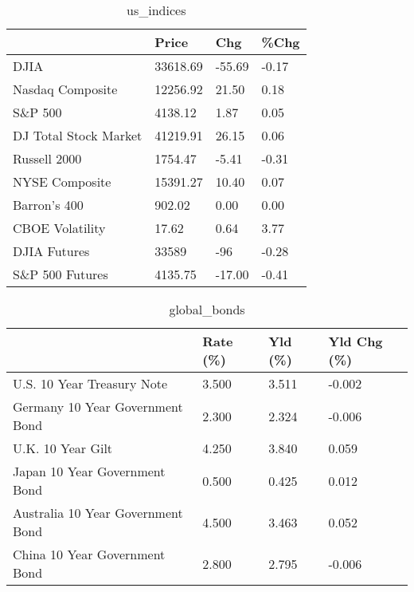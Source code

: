 \documentclass{article}%
\begin{document}
%


\begin{table}[htbp]%
\caption{us\_indices}%
\centering%
\begin{adjustbox}{width=1\textwidth}%
\begin{tabular}{llll}
\toprule
                      &    Price &    Chg &  \%Chg \\
\midrule
                 DJIA & 33618.69 & -55.69 & -0.17 \\
     Nasdaq Composite & 12256.92 &  21.50 &  0.18 \\
              S\&P 500 &  4138.12 &   1.87 &  0.05 \\
DJ Total Stock Market & 41219.91 &  26.15 &  0.06 \\
         Russell 2000 &  1754.47 &  -5.41 & -0.31 \\
       NYSE Composite & 15391.27 &  10.40 &  0.07 \\
         Barron's 400 &   902.02 &   0.00 &  0.00 \\
      CBOE Volatility &    17.62 &   0.64 &  3.77 \\
         DJIA Futures &    33589 &    -96 & -0.28 \\
      S\&P 500 Futures &  4135.75 & -17.00 & -0.41 \\
\bottomrule
\end{tabular}
%
\end{adjustbox}%
\end{table}

%


\begin{table}[htbp]%
\caption{global\_bonds}%
\centering%
\begin{adjustbox}{width=1\textwidth}%
\begin{tabular}{llll}
\toprule
                                  & Rate (\%) & Yld (\%) & Yld Chg (\%) \\
\midrule
       U.S. 10 Year Treasury Note &    3.500 &   3.511 &      -0.002 \\
  Germany 10 Year Government Bond &    2.300 &   2.324 &      -0.006 \\
                U.K. 10 Year Gilt &    4.250 &   3.840 &       0.059 \\
    Japan 10 Year Government Bond &    0.500 &   0.425 &       0.012 \\
Australia 10 Year Government Bond &    4.500 &   3.463 &       0.052 \\
    China 10 Year Government Bond &    2.800 &   2.795 &      -0.006 \\
\bottomrule
\end{tabular}
%
\end{adjustbox}%
\end{table}
\end{document}
